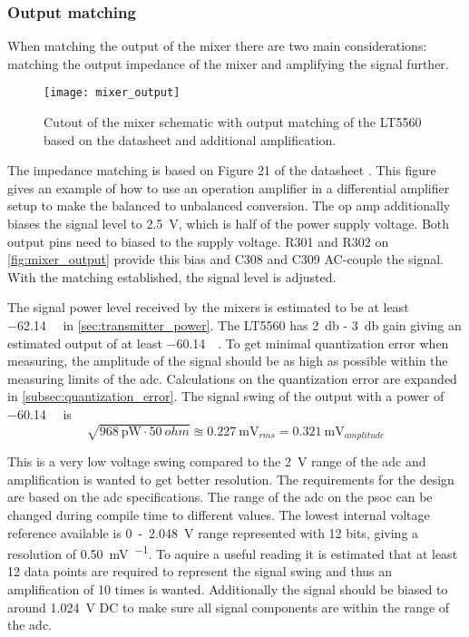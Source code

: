 \subsubsection*{Output matching}
When matching the output of the mixer there are two main considerations: matching the output impedance of the mixer and amplifying the signal further.

\begin{figure} [h]
\centering
\texttt{[image: mixer\_output]}
\caption{Cutout of the mixer schematic with output matching of the LT5560 based on the datasheet \cite{datasheet:LT5560} and additional amplification.}
\label{fig:mixer_output}
\end{figure}

The impedance matching is based on Figure 21 of the datasheet \citep{datasheet:LT5560}. This figure gives an example of how to use an operation amplifier in a differential amplifier setup to make the balanced to unbalanced conversion. The op amp additionally biases the signal level to \SI{2.5}{\volt}, which is half of the power supply voltage. Both output pins need to biased to the supply voltage. R301 and R302 on \autoref{fig:mixer_output} provide this bias and C308 and C309 AC-couple the signal. With the matching established, the signal level is adjusted.

The signal power level received by the mixers is estimated to be at least \SI{-62,14}{\deci\belm} in \autoref{sec:transmitter_power}. The LT5560 has \SI{2}{\decibel} - \SI{3}{\decibel} gain giving an estimated output of at least \SI{-60,14}{\deci\belm}. To get minimal quantization error when measuring, the amplitude of the signal should be as high as possible within the measuring limits of the \gls{adc}. Calculations on the quantization error are expanded in \autoref{subsec:quantization_error}. The signal swing of the output with a power of \SI{-60,14}{\deci\belm} is 
\begin{equation}
	\sqrt{\SI{968}{\pico\watt} \cdot 50~\si{ohm}} \approxeq \SI{0,227}{\milli\volt}_{rms} = \SI{0,321}{\milli\volt}_{amplitude}
\end{equation}

This is a very low voltage swing compared to the \SI{2}{\volt} range of the \gls{adc} and amplification is wanted to get better resolution. 
The requirements for the design are based on the \gls{adc} specifications. The range of the \gls{adc} on the \gls{psoc} can be changed during compile time to different values. The lowest internal voltage reference available is 0~-~\SI{2,048}{\volt} range represented with 12 bits, giving a resolution of \SI[per-mode=symbol]{0,50}{\milli\volt\per\bit}. 
To aquire a useful reading it is estimated that at least 12 data points are required to represent the signal swing and thus an amplification of 10 times is wanted. Additionally the signal should be biased to around \SI{1,024}{\volt} DC to make sure all signal components are within the range of the \gls{adc}. 

